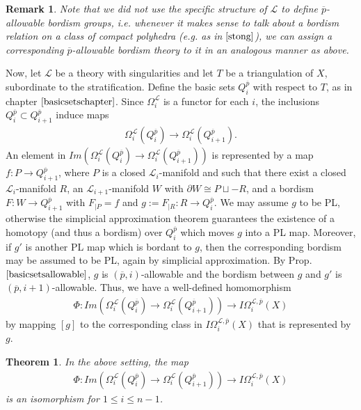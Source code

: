 \documentclass{scrreprt}
\newtheorem{theorem}[prop]{Theorem}
\newtheorem{remark}[prop]{Remark}
\begin{document}
\begin{remark}
Note that we did not use the specific structure of $\mathcal{L}$ to define $\overline{p}$-allowable bordism groups, i.e. whenever it makes sense to talk about a bordism relation on a class of compact polyhedra (e.g. as in $\cite{stong}$), we can assign a corresponding $\overline{p}$-allowable bordism theory to it in an analogous manner as above. 
\end{remark}

Now, let $\mathcal{L}$ be a theory with singularities and let $T$ be a triangulation of $X$, subordinate to the stratification. Define the basic sets $Q_i^{\overline{p}}$ with respect to $T$, as in chapter $\ref{basicsetschapter}$. Since $\Omega_i^{\mathcal{L}}$ is a functor for each $i$, the inclusions $Q_i^{\overline{p}} \subset Q_{i+1}^{\overline{p}}$ induce maps
\begin{align*}
\Omega_i^{\mathcal{L}}(Q_{i}^{\overline{p}}) \to \Omega_i^{\mathcal{L}}(Q_{i+1}^{\overline{p}}).
\end{align*}
An element in $Im(\Omega_i^{\mathcal{L}}(Q_{i}^{\overline{p}}) \to \Omega_i^{\mathcal{L}}(Q_{i+1}^{\overline{p}}))$ is represented by a map $f: P \to Q_{i+1}^{\overline{p}}$, where $P$ is a closed $\mathcal{L}_i$-manifold and such that there exist a closed $\mathcal{L}_i$-manifold $R$, an $\mathcal{L}_{i+1}$-manifold $W$ with $\partial W \cong P \sqcup -R$, and a bordism $F: W \to Q_{i+1}^{\overline{p}}$ with $F_{|P}=f$ and $g:=F_{|R}: R \to Q_{i}^{\overline{p}}$. We may assume $g$ to be PL, otherwise the simplicial approximation theorem guarantees the existence of a homotopy (and thus a bordism) over $Q_i^{\overline{p}}$ which moves $g$ into a PL map. Moreover, if $g'$ is another PL map which is bordant to $g$, then the corresponding bordism may be assumed to be PL, again by simplicial approximation. By Prop.$\ref{basicsetsallowable}$, $g$ is $(\overline{p},i)$-allowable and the bordism between $g$ and $g'$ is $(\overline{p},i+1)$-allowable. Thus, we have a well-defined homomorphism
\begin{align*}
\Phi : Im(\Omega_i^{\mathcal{L}}(Q_{i}^{\overline{p}}) \to \Omega_i^{\mathcal{L}}(Q_{i+1}^{\overline{p}})) \to I\Omega_i^{\mathcal{L}, \overline{p}}(X)
\end{align*}
by mapping $[g]$ to the corresponding class in $I\Omega_i^{\mathcal{L}, \overline{p}}(X)$ that is represented by $g$.

\begin{theorem}\label{maintheorem}
In the above setting, the map
\begin{align*}
\Phi : Im(\Omega_i^{\mathcal{L}}(Q_{i}^{\overline{p}}) \to \Omega_i^{\mathcal{L}}(Q_{i+1}^{\overline{p}})) \to I\Omega_i^{\mathcal{L}, \overline{p}}(X)
\end{align*}
is an isomorphism for $1 \leq i \leq n-1$.
\end{theorem}
\end{document}
